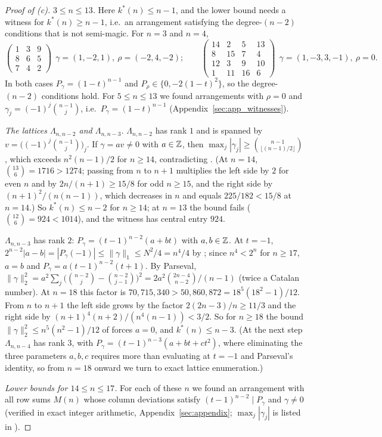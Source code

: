 \begin{proof}[Proof of (c)]
\emph{$3\le n\le13$.}  Here $k^*(n)\le n-1$, and the lower bound needs a witness for $k^*(n)\ge n-1$, i.e.\ an arrangement satisfying the degree-$(n-2)$ conditions that is not semi-magic.  For $n=3$ and $n=4$,
\[
\begin{pmatrix}1&3&9\\8&6&5\\7&4&2\end{pmatrix}\ \ \gamma=(1,-2,1),\ \rho=(-2,4,-2);\qquad
\begin{pmatrix}14&2&5&13\\8&15&7&4\\12&3&9&10\\1&11&16&6\end{pmatrix}\ \ \gamma=(1,-3,3,-1),\ \rho=0.
\]
In both cases $P_\gamma=(1-t)^{n-1}$ and $P_\rho\in\{0,-2(1-t)^2\}$, so the degree-$(n-2)$ conditions hold.
For $5\le n\le13$ we found arrangements with $\rho=0$ and $\gamma_j=(-1)^j\binom{n-1}j$, i.e.\ $P_\gamma=(1-t)^{n-1}$ (Appendix~\ref{sec:app_witnesses}).

\emph{The lattices $\Lambda_{n,n-2}$ and $\Lambda_{n,n-3}$.}  $\Lambda_{n,n-2}$ has rank $1$ and is spanned by $v=\bigl((-1)^j\binom{n-1}j\bigr)_j$.  If $\gamma=av\ne0$ with $a\in\mathbb{Z}$, then $\max_j|\gamma_j|\ge\binom{n-1}{\lfloor(n-1)/2\rfloor}$, which exceeds $n^2(n-1)/2$ for $n\ge14$, contradicting .
(At $n=14$, $\binom{13}6=1716>1274$; passing from $n$ to $n+1$ multiplies the left side by $2$ for even $n$ and by $2n/(n+1)\ge15/8$ for odd $n\ge15$, and the right side by $(n+1)^2/(n(n-1))$, which decreases in $n$ and equals $225/182<15/8$ at $n=14$.)
So $k^*(n)\le n-2$ for $n\ge14$; at $n=13$ the bound fails ($\binom{12}6=924<1014$), and the witness has central entry $924$.

$\Lambda_{n,n-3}$ has rank $2$: $P_\gamma=(t-1)^{n-2}(a+bt)$ with $a,b\in\mathbb{Z}$.
At $t=-1$, $2^{n-2}|a-b|=|P_\gamma(-1)|\le\|\gamma\|_1\le N^2/4=n^4/4$ by ; since $n^4<2^n$ for $n\ge17$, $a=b$ and $P_\gamma=a(t-1)^{n-2}(t+1)$.
By Parseval, $\|\gamma\|_2^2=a^2\sum_j\bigl(\binom{n-2}j-\binom{n-2}{j-1}\bigr)^2=2a^2\binom{2n-4}{n-2}/(n-1)$ (twice a Catalan number).
At $n=18$ this factor is $70{,}715{,}340>50{,}860{,}872=18^5(18^2-1)/12$.
From $n$ to $n+1$ the left side grows by the factor $2(2n-3)/n\ge11/3$ and the right side by $(n+1)^4(n+2)/(n^4(n-1))<3/2$.
So for $n\ge18$ the bound $\|\gamma\|_2^2\le n^5(n^2-1)/12$ of  forces $a=0$, and $k^*(n)\le n-3$.
(At the next step $\Lambda_{n,n-4}$ has rank $3$, with $P_\gamma=(t-1)^{n-3}(a+bt+ct^2)$, where eliminating the three parameters $a,b,c$ requires more than evaluating at $t=-1$ and Parseval's identity, so from $n=18$ onward we turn to exact lattice enumeration.)

\emph{Lower bounds for $14\le n\le17$.}  For each of these $n$ we found an arrangement with all row sums $M(n)$ whose column deviations satisfy $(t-1)^{n-2}\mid P_\gamma$ and $\gamma\ne0$ (verified in exact integer arithmetic, Appendix~\ref{sec:appendix}; $\max_j|\gamma_j|$ is listed in ).
\end{proof}

